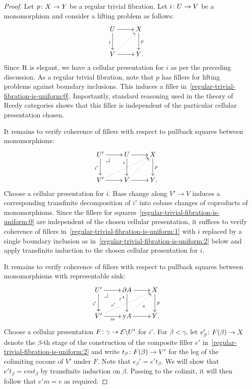 \documentclass[reqno,10pt,a4paper,oneside,draft]{amsart}
\begin{document}
\begin{proof} Let $p \colon X \to Y$ be a regular trivial fibration.
Let $i \colon U \to V$ be a monomorphism and consider a lifting problem as follows:
\begin{equation} \label{regular-trivial-fibration-is-uniform:0}
\xycenter{
  U
  \ar[d]_{i}
  \ar[r]
&
  X
  \ar[d]^{p}
\\
  V
  \ar[r]
  \ar@{.>}[ur]
&
  Y
\rlap{.}
}
\end{equation}
Since $\mathrm{R}$ is elegant, we have a cellular presentation for $i$ as per the preceding discussion.
As a regular trivial fibration, note that $p$ has fillers for lifting problems against boundary inclusions.
This induces a filler in~\eqref{regular-trivial-fibration-is-uniform:0}.
Importantly, standard reasoning used in the theory of Reedy categories shows that this filler is independent of the particular cellular presentation chosen.

It remains to verify coherence of fillers with respect to pullback squares between monomorphisms:
\begin{equation} \label{regular-trivial-fibration-is-uniform:1}
\xycenter{
  U'
  \ar[d]_{i'}
  \ar[r]
  \pullback{dr}
&
  U
  \ar[d]_(0.3){i}
  \ar[r]
&
  X
  \ar[d]^{p}
\\
  V'
  \ar[r]
  \ar@{.>}[urr]
&
  V
  \ar[r]
  \ar@{.>}[ur]
&
  Y
\rlap{.}}
\end{equation}
Choose a cellular presentation for $i$.
Base change along $V' \to V$ induces a corresponding transfinite decomposition of $i'$ into cobase changes of coproducts of monomorphisms.
Since the fillers for squares~\eqref{regular-trivial-fibration-is-uniform:0} are independent of the chosen cellular presentation, it suffices to verify coherence of fillers in~\eqref{regular-trivial-fibration-is-uniform:1} with $i$ replaced by a single boundary inclusion as in~\eqref{regular-trivial-fibration-is-uniform:2} below and apply transfinite induction to the chosen cellular presentation for $i$.

It remains to verify coherence of fillers with respect to pullback squares between monomorphisms with representable sink:
\begin{equation} \label{regular-trivial-fibration-is-uniform:2}
\xycenter{
  U'
  \ar[d]_{i'}
  \ar[r]
  \pullback{dr}
&
  \partial A
  \ar[d]_(0.3){i^A}
  \ar[r]
&
  X
  \ar[d]^{p}
\\
  V'
  \ar[r]_{m}
  \ar@{.>}[urr]^(0.3){e'}
&
  \yon A
  \ar[r]
  \ar@{.>}[ur]_{e}
&
  Y
\rlap{.}}
\end{equation}
Choose a cellular presentation $F \colon \gamma \to \mathcal{E} \backslash U'$ for $i'$.
For $\beta < \gamma$, let $e_{\beta}' \colon F(\beta) \to X$ denote the $\beta$-th stage of the construction of the composite filler $e'$ in~\eqref{regular-trivial-fibration-is-uniform:2} and write $t_{\beta} \colon F(\beta) \to V'$ for the leg of the colimiting cocone of $V'$ under $F$.
Note that $e_{\beta}' = e' t_{\beta}$.
We will show that $e' t_{\beta} = e m t_{\beta}$ by transfinite induction on $\beta$.
Passing to the colimit, it will then follow that $e' m = e$ as required.


\end{proof}
\end{document}
